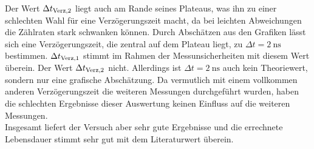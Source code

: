 Der Wert $\Delta t_{\text{Verz,2}}$ liegt auch am Rande seines Plateaus, was ihn zu einer schlechten Wahl für eine Verzögerungszeit macht, da bei leichten Abweichungen die Zählraten stark schwanken können.
Durch Abschätzen aus den Grafiken lässt sich eine Verzögerungszeit, die zentral auf dem Plateau liegt, zu $\Delta t = \SI{2}{\nano\second}$ bestimmen.
$\Delta t_{\text{Verz,1}}$ stimmt im Rahmen der Messunsicherheiten mit diesem Wert überein. Der Wert $\Delta t_{\text{Verz,2}}$ nicht. 
Allerdings ist $\Delta t = \SI{2}{\nano\second}$ auch kein Theoriewert, sondern nur eine grafische Abschätzung. 
Da vermutlich mit einem vollkommen anderen Verzögerungszeit die weiteren Messungen durchgeführt wurden, haben die schlechten Ergebnisse dieser Auswertung keinen Einfluss auf die weiteren Messungen.\\
Insgesamt liefert der Versuch aber sehr gute Ergebnisse und die errechnete Lebensdauer stimmt sehr gut mit dem Literaturwert überein.

